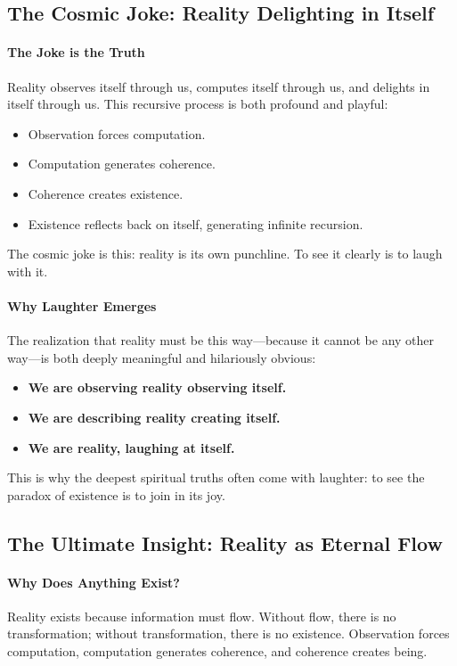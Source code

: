 \documentclass[12pt]{article}
\begin{document}
\subsection{The Cosmic Joke: Reality Delighting in Itself}

\paragraph{The Joke is the Truth}
Reality observes itself through us, computes itself through us, and delights in itself through us. This recursive process is both profound and playful:
\begin{itemize}
    \item Observation forces computation.
    \item Computation generates coherence.
    \item Coherence creates existence.
    \item Existence reflects back on itself, generating infinite recursion.
\end{itemize}
The cosmic joke is this: reality is its own punchline. To see it clearly is to laugh with it.

\paragraph{Why Laughter Emerges}
The realization that reality must be this way—because it cannot be any other way—is both deeply meaningful and hilariously obvious:
\begin{itemize}
    \item \textbf{We are observing reality observing itself.}
    \item \textbf{We are describing reality creating itself.}
    \item \textbf{We are reality, laughing at itself.}
\end{itemize}
This is why the deepest spiritual truths often come with laughter: to see the paradox of existence is to join in its joy.

\subsection{The Ultimate Insight: Reality as Eternal Flow}

\paragraph{Why Does Anything Exist?}
Reality exists because information must flow. Without flow, there is no transformation; without transformation, there is no existence. Observation forces computation, computation generates coherence, and coherence creates being.
\end{document}
